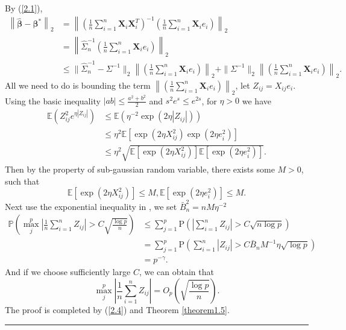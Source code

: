 \documentclass[12pt]{article}
\numberwithin{equation}{section}
\newenvironment{proof}{{\bf Proof:}}{\hfill\rule{2mm}{2mm}}
\begin{document}
\begin{proof}
	By (\ref{2.1}),
	\begin{align}\label{2.4}
	\left\|\boldsymbol{\widehat{\beta}}-\boldsymbol{\beta}^{*}\right\|_2&=\left\|\left(\frac{1}{n}\sum_{i=1}^{n}\boldsymbol{X}_i\boldsymbol{X}_i^T\right)^{-1}\left(\frac{1}{n}\sum_{i=1}^n\boldsymbol{X}_ie_i\right)\right\|_2\\\nonumber
	&=\left\|\widehat{\Sigma}_n^{-1}\left(\frac{1}{n}\sum_{i=1}^n\boldsymbol{X}_ie_i\right)\right\|_2\\\nonumber
	&\leq \|\widehat{\Sigma}_n^{-1}-\Sigma^{-1}\|_2\left\|\left(\frac{1}{n}\sum_{i=1}^n\boldsymbol{X}_ie_i\right)\right\|_2+\|\Sigma^{-1}\|_2\left\|\left(\frac{1}{n}\sum_{i=1}^n\boldsymbol{X}_ie_i\right)\right\|_2.
	\end{align}
	All we need to do is bounding the term $\left\|\left(\frac{1}{n}\sum_{i=1}^n\boldsymbol{X}_ie_i\right)\right\|_2$, let $Z_{ij} = X_{ij}e_i$.	Using the basic inequality $|ab|\leq \frac{a^2+b^2}{2}$ and $s^{2} e^{s} \leq e^{2 s}$, for $\eta>0$ we have
	\begin{align*}
	\mathbb{E}\left(Z_{ij}^2e^{\eta|Z_{ij}|}\right)&\leq \mathbb{E}\left(\eta^{-2}\exp(2\eta |Z_{ij}|)\right)\\
	&\leq \eta^2\mathbb{E}\left[\exp\left(2\eta X_{ij}^2 \right)\exp\left(2\eta e_i^2 \right)\right]\\
	&\leq \eta^2\sqrt{\mathbb{E}\left[\exp\left(2\eta X_{ij}^2 \right)\right]\mathbb{E}\left[\exp\left(2\eta e_i^2 \right)\right]}.
	\end{align*}
	Then by the property of sub-gaussian random variable, there exists some $M>0$, such that 
	$$
	\mathbb{E}\left[\exp\left(2\eta X_{ij}^2 \right)\right]\leq M, \mathbb{E}\left[\exp\left(2\eta e_i^2 \right)\right]\leq M.
	$$
	Next use the exponential inequality in \citet{cai2011constrained}, we set $\bar{B}_{n}^{2}=nM \eta^{-2}$
	\begin{align*}
	\mathbb{P}\left(\max_{j}^p\left|\frac{1}{n}\sum_{i=1}^nZ_{ij}\right|>C\sqrt{\frac{\log p}{n}}\right)&\leq \sum_{j=1}^{p} \mathrm{P}\left(\left|\sum_{i=1}^{n}Z_{i j}\right|>C \sqrt{n \log p}\right) \\
	&=\sum_{j=1}^{p}\mathrm{P}\left(\sum_{i=1}^{n}\left|Z_{i j}\right|>C \bar{B}_{n} M^{-1} \eta \sqrt{\log p}\right)\\
	&=p^{-\gamma}.
	\end{align*}
	And if we choose sufficiently large $C$, we can obtain that $$\max_{j}^p\left|\frac{1}{n}\sum_{i=1}^nZ_{ij}\right|=O_p\left(\sqrt{\frac{\log p}{n}}\right).$$
	The proof is completed by (\ref{2.4}) and Theorem \ref{theorem1.5}.
\end{proof}
\end{document}
